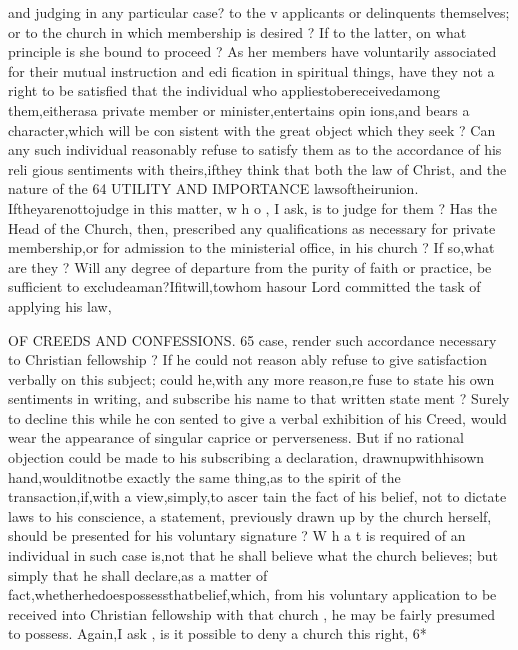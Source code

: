 \documentclass[
]{book}
\begin{document}
and judging in any particular case? to the v applicants or delinquents themselves; or to the church in which membership is desired ?
If to the latter, on what principle is she bound
to proceed ? As her members have voluntarily associated for their mutual instruction and edi
fication in spiritual things, have they not a right to be satisfied that the individual who
appliestobereceivedamong them,eitherasa private member or minister,entertains opin ions,and bears a character,which will be con
sistent with the great object which they seek ? Can any such individual reasonably refuse to satisfy them as to the accordance of his reli gious sentiments with theirs,ifthey think that both the law of Christ, and the nature of the
64 UTILITY AND IMPORTANCE
lawsoftheirunion. Iftheyarenottojudge
in this matter, w h o , I ask, is to judge for them ? Has the Head of the Church, then,
prescribed any qualifications as necessary for private membership,or for admission to the
ministerial office, in his church ? If so,what are they ? Will any degree of departure from the purity of faith or practice, be sufficient to excludeaman?Ifitwill,towhom hasour Lord committed the task of applying his law,

OF CREEDS AND CONFESSIONS. 65
case, render such accordance necessary to Christian fellowship ? If he could not reason
ably refuse to give satisfaction verbally on this subject; could he,with any more reason,re fuse to state his own sentiments in writing, and subscribe his name to that written state
ment ? Surely to decline this while he con sented to give a verbal exhibition of his Creed, would wear the appearance of singular caprice or perverseness. But if no rational objection could be made to his subscribing a declaration, drawnupwithhisown hand,woulditnotbe exactly the same thing,as to the spirit of the transaction,if,with a view,simply,to ascer tain the fact of his belief, not to dictate laws to his conscience, a statement, previously
drawn up by the church herself, should be presented for his voluntary signature ? W h a t is required of an individual in such case is,not that he shall believe what the church believes;
but simply that he shall declare,as a matter of fact,whetherhedoespossessthatbelief,which, from his voluntary application to be received into Christian fellowship with that church , he
may be fairly presumed to possess. Again,I ask , is it possible to deny a church this right,
6*
\end{document}
